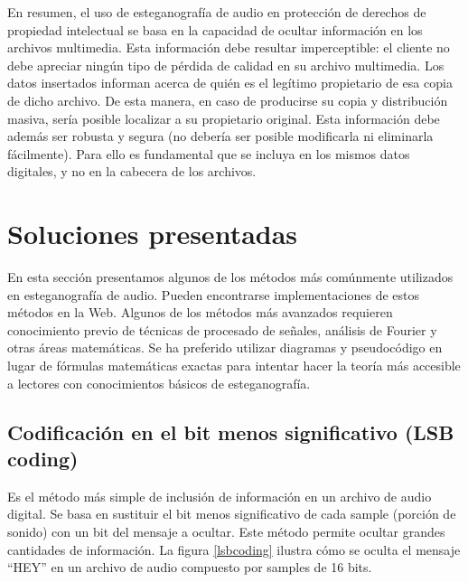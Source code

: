 \documentclass[12pt]{article}
\begin{document}
En resumen, el uso de esteganografía de audio en protección de derechos de propiedad intelectual se basa en la capacidad de ocultar información en los archivos multimedia. Esta información debe resultar imperceptible: el cliente no debe apreciar ningún tipo de pérdida de calidad en su archivo multimedia. Los datos insertados informan acerca de quién es el legítimo propietario de esa copia de dicho archivo. De esta manera, en caso de producirse su copia y distribución masiva, sería posible localizar a su propietario original. Esta información debe además ser robusta y segura (no debería ser posible modificarla ni eliminarla fácilmente). Para ello es fundamental que se incluya en los mismos datos digitales, y no en la cabecera de los archivos.

\newpage
\section{Soluciones presentadas}

En esta sección presentamos algunos de los métodos más comúnmente utilizados en esteganografía de audio. Pueden encontrarse implementaciones de estos métodos en la Web. Algunos de los métodos más avanzados requieren conocimiento previo de técnicas de procesado de señales, análisis de Fourier y otras áreas matemáticas. Se ha preferido utilizar diagramas y pseudocódigo en lugar de fórmulas matemáticas exactas para intentar hacer la teoría más accesible a lectores con conocimientos básicos de esteganografía.

\subsection{Codificación en el bit menos significativo (LSB coding)}

Es el método más simple de inclusión de información en un archivo de audio digital. Se basa en sustituir el bit menos significativo de cada sample (porción de sonido) con un bit del mensaje a ocultar. Este método permite ocultar grandes cantidades de información. La figura \ref{lsbcoding} ilustra cómo se oculta el mensaje ``HEY'' en un archivo de audio compuesto por samples de 16 bits.
\end{document}
